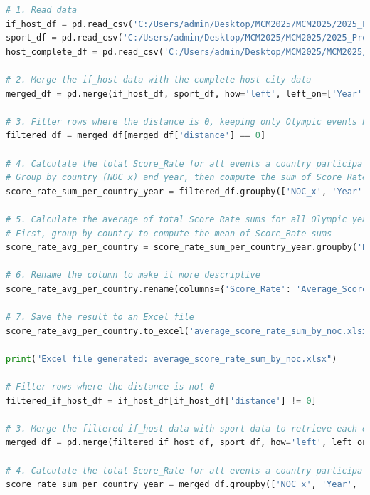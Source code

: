\documentclass[12pt]{article}
\begin{document}
\begin{lstlisting}[language=Python, style=mystyle, caption=data\_analyze.ipynb]
# 1. Read data
if_host_df = pd.read_csv('C:/Users/admin/Desktop/MCM2025/MCM2025/2025_Problem_C_Data/if_host.csv')
sport_df = pd.read_csv('C:/Users/admin/Desktop/MCM2025/MCM2025/2025_Problem_C_Data/score_rate_with_host.csv')
host_complete_df = pd.read_csv('C:/Users/admin/Desktop/MCM2025/MCM2025/2025_Problem_C_Data/summerOly_hosts_completed.csv')

# 2. Merge the if_host data with the complete host city data
merged_df = pd.merge(if_host_df, sport_df, how='left', left_on=['Year', 'NOC_x'], right_on=['Year', 'NOC_x'])

# 3. Filter rows where the distance is 0, keeping only Olympic events hosted by the country
filtered_df = merged_df[merged_df['distance'] == 0]

# 4. Calculate the total Score_Rate for all events a country participated in during each Olympic year
# Group by country (NOC_x) and year, then compute the sum of Score_Rate
score_rate_sum_per_country_year = filtered_df.groupby(['NOC_x', 'Year'])['Score_Rate'].sum().reset_index()

# 5. Calculate the average of total Score_Rate sums for all Olympic years a country participated in
# First, group by country to compute the mean of Score_Rate sums
score_rate_avg_per_country = score_rate_sum_per_country_year.groupby('NOC_x')['Score_Rate'].mean().reset_index()

# 6. Rename the column to make it more descriptive
score_rate_avg_per_country.rename(columns={'Score_Rate': 'Average_Score_Rate_Sum'}, inplace=True)

# 7. Save the result to an Excel file
score_rate_avg_per_country.to_excel('average_score_rate_sum_by_noc.xlsx', index=False)

print("Excel file generated: average_score_rate_sum_by_noc.xlsx")

# Filter rows where the distance is not 0
filtered_if_host_df = if_host_df[if_host_df['distance'] != 0]

# 3. Merge the filtered if_host data with sport data to retrieve each event's Score_Rate, along with corresponding NOC and Year
merged_df = pd.merge(filtered_if_host_df, sport_df, how='left', left_on=['Year', 'NOC_x'], right_on=['Year', 'NOC_x'])

# 4. Calculate the total Score_Rate for all events a country participated in during each Olympic year, keeping the distance column
score_rate_sum_per_country_year = merged_df.groupby(['NOC_x', 'Year', 'distance'])['Score_Rate'].sum().reset_index()


\end{lstlisting}
\end{document}
